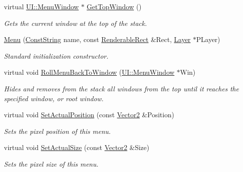 \begin{DoxyCompactItemize}
virtual \hyperlink{classMezzanine_1_1UI_1_1MenuWindow}{UI::MenuWindow} $\ast$ \hyperlink{classMezzanine_1_1UI_1_1Menu_a370c1411203c58698104a92d2b508b99}{GetTopWindow} ()
\begin{DoxyCompactList}\small\item\em Gets the current window at the top of the stack. \item\end{DoxyCompactList}\item 
\hyperlink{classMezzanine_1_1UI_1_1Menu_a8f3d2f15d3b620eba00e2c5c713881f5}{Menu} (\hyperlink{namespaceMezzanine_a63cd699ac54b73953f35ec9cfc05e506}{ConstString} name, const \hyperlink{structMezzanine_1_1UI_1_1RenderableRect}{RenderableRect} \&Rect, \hyperlink{classMezzanine_1_1UI_1_1Layer}{Layer} $\ast$PLayer)
\begin{DoxyCompactList}\small\item\em Standard initialization constructor. \item\end{DoxyCompactList}\item 
virtual void \hyperlink{classMezzanine_1_1UI_1_1Menu_a671031f5e8ae5890d952e5f6646cdb66}{RollMenuBackToWindow} (\hyperlink{classMezzanine_1_1UI_1_1MenuWindow}{UI::MenuWindow} $\ast$Win)
\begin{DoxyCompactList}\small\item\em Hides and removes from the stack all windows from the top until it reaches the specified window, or root window. \item\end{DoxyCompactList}\item 
virtual void \hyperlink{classMezzanine_1_1UI_1_1Menu_a0638a7f234bc62e4c7b7dc0253a5d68e}{SetActualPosition} (const \hyperlink{classMezzanine_1_1Vector2}{Vector2} \&Position)
\begin{DoxyCompactList}\small\item\em Sets the pixel position of this menu. \item\end{DoxyCompactList}\item 
virtual void \hyperlink{classMezzanine_1_1UI_1_1Menu_a639a1362c09b87855a8c574995c4af87}{SetActualSize} (const \hyperlink{classMezzanine_1_1Vector2}{Vector2} \&Size)
\begin{DoxyCompactList}\small\item\em Sets the pixel size of this menu. \item\end{DoxyCompactList}\item 

\end{DoxyCompactItemize}
